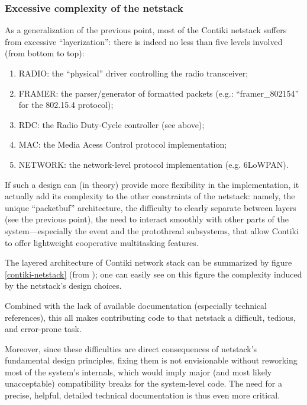 \documentclass[12pt,a4paper]{article}
\begin{document}

\subsubsection{Excessive complexity of the netstack}

As a generalization of the previous point, most of the Contiki netstack
suffers from excessive ``layerization'': there is indeed no less than five
levels involved (from bottom to top):
\begin{enumerate}
\item RADIO: the ``physical'' driver controlling the radio transceiver;
\item FRAMER: the parser/generator of formatted packets (e.g.:
              ``framer\_802154'' for the 802.15.4 protocol);
\item RDC: the Radio Duty-Cycle controller (see above);
\item MAC: the Media Acess Control protocol implementation;
\item NETWORK: the network-level protocol implementation (e.g. 6LoWPAN).
\end{enumerate}

If such a design can (in theory) provide more flexibility in the
implementation, it actually add its complexity to the other
constraints of the netstack: namely, the unique ``packetbuf'' architecture,
the difficulty to clearly separate between layers (see the previous point),
the need to interact smoothly with other parts of the system---especially
the event and the protothread \cite{pt} subsystems, that allow Contiki
to offer lightweight cooperative multitasking features.

The layered architecture of Contiki network stack can be summarized
by figure \ref{contiki-netstack} (from \cite{judit-blog});
one can easily see on this figure the complexity induced by
the netstack's design choices.

Combined with the lack of available documentation (especially technical
references), this all makes contributing code to that netstack a difficult,
tedious, and error-prone task.

Moreover, since these difficulties are direct consequences of netstack's
fundamental design principles, fixing them is not envisionable without
reworking most of the system's internals, which would imply major (and
most likely unacceptable) compatibility breaks for the system-level code.
The need for a precise, helpful, detailed technical documentation is thus
even more critical.
\end{document}
